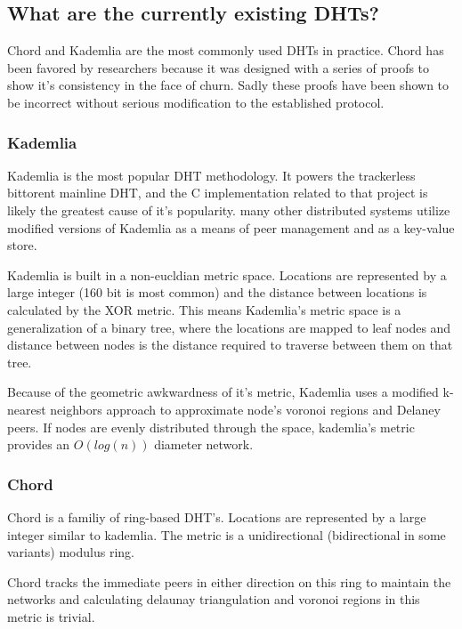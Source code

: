 \documentclass[conference]{IEEEtran}
\begin{document}
\subsection{What are the currently existing DHTs?}

Chord and Kademlia are the most commonly used DHTs in practice. 
Chord has been favored by researchers because it was designed with a series of proofs to show it's consistency in the face of churn.
Sadly these proofs have been shown to be incorrect\cite{} without serious modification to the established protocol.

\subsubsection{Kademlia}

Kademlia is the most popular DHT methodology. 
It powers the trackerless bittorent mainline DHT, and the C implementation related to that project is likely the greatest cause of it's popularity.
many other distributed systems utilize modified versions of Kademlia as a means of peer management and as a key-value store.

Kademlia is built in a non-eucldian metric space. 
Locations are represented by a large integer (160 bit is most common) and the distance between locations is calculated by the XOR metric.
This means Kademlia's metric space is a generalization of a binary tree, where the locations are mapped to leaf nodes and distance between nodes is the distance required to traverse between them on that tree.

Because of the geometric awkwardness of it's metric, Kademlia uses a modified k-nearest neighbors approach to approximate node's voronoi regions and Delaney peers.
If nodes are evenly distributed through the space, kademlia's metric provides an $O(log(n))$ diameter network.

\subsubsection{Chord}

Chord is a familiy of ring-based DHT's.
Locations are represented by a large integer similar to kademlia.
The metric is a unidirectional (bidirectional in some variants) modulus ring.

Chord tracks the immediate peers in either direction on this ring to maintain the networks and calculating delaunay triangulation and voronoi regions in this metric is trivial.
\end{document}
